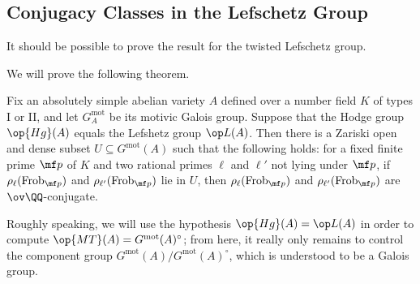 \documentclass{article}
\begin{document}
\subsection{Conjugacy Classes in the Lefschetz Group}
\begin{remark}
	It should be possible to prove the result for the twisted Lefschetz group.
\end{remark}
We will prove the following theorem.
\begin{theorem} \label{thm:under-hodge-is-lefschetz}
	Fix an absolutely simple abelian variety $A$ defined over a number field $K$ of types I or II, and let $G^{\mathrm{mot}}_A$ be its motivic Galois group. Suppose that the Hodge group $\op{Hg}(A)$ equals the Lefshetz group $\op L(A)$. Then there is a Zariski open and dense subset $U\subseteq G^{\mathrm{mot}}(A)$ such that the following holds: for a fixed finite prime $\mf p$ of $K$ and two rational primes $\ell$ and $\ell'$ not lying under $\mf p$, if $\rho_\ell(\mathrm{Frob}_{\mf p})$ and $\rho_{\ell'}(\mathrm{Frob}_{\mf p})$ lie in $U$, then $\rho_{\ell}(\mathrm{Frob}_{\mf p})$ and $\rho_{\ell'}(\mathrm{Frob}_{\mf p})$ are $\ov\QQ$-conjugate.
\end{theorem}
Roughly speaking, we will use the hypothesis $\op{Hg}(A)=\op L(A)$ in order to compute $\op{MT}(A)=G^{\mathrm{mot}}(A)^\circ$; from here, it really only remains to control the component group $G^{\mathrm{mot}}(A)/G^{\mathrm{mot}}(A)^\circ$, which is understood to be a Galois group.
\end{document}
